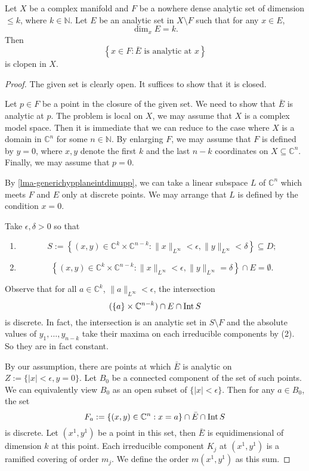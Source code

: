 \begin{lemma}\label{lma-fundlma}
    Let $X$ be a complex manifold and $F$ be a nowhere dense analytic set of dimension $\leq k$, where $k\in \mathbb{N}$. Let $E$ be an analytic set in $X\setminus F$ such that for any $x\in E$,
    \[
        \dim_x E=k.  
    \]
    Then
    \[
        \left\{x\in F: \bar{E}\text{ is analytic at }x \right\}  
    \]
    is clopen in $X$.
\end{lemma}
\begin{proof}
    The given set is clearly open. It suffices to show that it is closed.

    Let $p\in F$ be a point in the closure of the given set. We need to show that $\bar{E}$ is analytic at $p$. The problem is local on $X$, we may assume that $X$ is a complex model space. Then it is immediate that we can reduce to the case where $X$ is a domain in $\mathbb{C}^n$ for some $n\in \mathbb{N}$. By enlarging $F$, we may assume that $F$ is defined by $y=0$, where $x,y$ denote the first $k$ and the last $n-k$ coordinates on $X\subseteq \mathbb{C}^n$. Finally, we may assume that $p=0$.

    By \cref{lma-generichypplaneintdimupp}, we can take a linear subspace $L$ of $\mathbb{C}^n$ which meets $F$ and $E$ only at discrete points. We may arrange that $L$ is defined by the condition $x=0$.

    Take $\epsilon,\delta>0$ so that 
    \begin{enumerate}
        \item 
        \[
            S:=\left\{(x,y)\in \mathbb{C}^k\times \mathbb{C}^{n-k}: \|x\|_{L^{\infty}}<\epsilon,\|y\|_{L^{\infty}}<\delta \right\}\subseteq D;
        \]
        \item
        \[
            \left\{(x,y)\in \mathbb{C}^k\times \mathbb{C}^{n-k}: \|x\|_{L^{\infty}}<\epsilon,\|y\|_{L^{\infty}}=\delta \right\}\cap E=\emptyset.
        \]
    \end{enumerate}
    Observe that for all $a\in \mathbb{C}^k$, $\|a\|_{L^{\infty}}<\epsilon$, the intersection
    \[
        (\{a\}\times \mathbb{C}^{n-k})\cap E \cap \operatorname{Int} S 
    \]
    is discrete. In fact, the intersection is an analytic set in $S\setminus F$ and the absolute values of $y_1,\ldots,y_{n-k}$ take their maxima on each irreducible components by (2). So they are in fact constant.

    By our assumption, there are points at which $\bar{E}$ is analytic on $Z:=\{|x|<\epsilon,y=0\}$. Let $B_0$ be a connected component of the set of such points. We can equivalently view $B_0$ as an open subset of $\{|x|<\epsilon\}$. Then for any $a\in B_0$, the set
    \[
        F_a:=\{(x,y)\in \mathbb{C}^n:x=a\}\cap \bar{E}\cap \operatorname{Int} S  
    \]
    is discrete. Let $(x^1,y^1)$ be a point in this set, then $\bar{E}$ is equidimensional of dimension $k$ at this point. Each irreducible component $K_j$ at $(x^1,y^1)$ is a ramified covering of order $m_j$. We define the order $m(x^1,y^1)$ as this sum. 


\end{proof}
